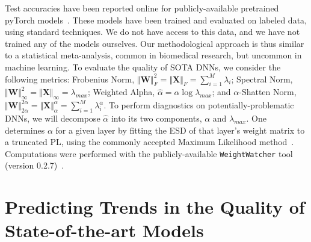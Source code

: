 \documentclass{article}
\begin{document}
Test accuracies have been reported online for publicly-available pretrained pyTorch models~\citep{osmr}.
These models have been trained and evaluated on labeled data, using standard techniques.  
We do not have access to this data, and we have not trained any of the models ourselves. 
Our methodological approach is thus similar to a statistical meta-analysis, common in biomedical research, but uncommon in machine learning.
%
To evaluate the quality of SOTA DNNs, we consider the following metrics:
Frobenius Norm, $\Vert\mathbf{W}\Vert^{2}_{F}=\Vert\mathbf{X}\Vert_{F}=\sum\nolimits_{i=1}^{M} \lambda_{i}$; 
Spectral Norm, $\Vert\mathbf{W}\Vert_{\infty}^{2}=\Vert\mathbf{X}\Vert_{\infty}=\lambda_{max}$;
Weighted Alpha, $\hat{\alpha}=\alpha\log\lambda_{max}$; and
$\alpha$-Shatten Norm, $\Vert\mathbf{W}\Vert^{2\alpha}_{2\alpha}=\Vert\mathbf{X}\Vert^{\alpha}_{\alpha}=\sum\nolimits_{i=1}^{M}\lambda_{i}^{\alpha}$. 
To perform diagnostics on potentially-problematic DNNs, we will decompose $\hat{\alpha}$ into its two components, $\alpha$ and $\lambda_{max}$.
One determines $\alpha$ for a given layer by fitting the ESD of that layer's weight matrix to a truncated PL, using the commonly accepted Maximum Likelihood method~\citep{CSN09_powerlaw,ABP14}.
Computations were performed with the publicly-available \texttt{WeightWatcher} tool (version 0.2.7)~\citep{weightwatcher_package}.


\section*{Predicting Trends in the Quality of State-of-the-art Models}


\end{document}
